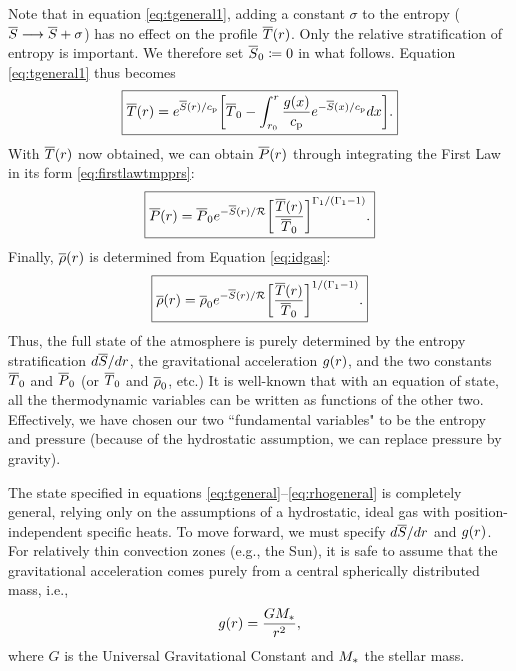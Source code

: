\documentclass[12pt]{article} %
\begin{document}
	Note that in equation \eqref{eq:tgeneral1}, adding a constant $\sigma$ to the entropy ($\overline{S}\longrightarrow \overline{S}+\sigma$) has no effect on the profile $\overline{T}(r)$. Only the relative stratification of entropy is important. We therefore set $\overline{S}_0\coloneqq0$ in what follows. Equation \eqref{eq:tgeneral1} thus becomes
		\begin{align}
		\boxed{
			\overline{T}(r) = e^{\overline{S}(r)/c_{\rm{p}}}\bigg{[}\overline{T}_0-\int_{r_0}^r \frac{g(x)}{c_{\rm{p}}}e^{-\overline{S}(x)/c_{\rm{p}}}dx \bigg{]}.
			\label{eq:tgeneral}}
	\end{align}
	With $\overline{T}(r)$ now obtained, we can obtain $\overline{P}(r)$ through integrating the First Law in its form \eqref{eq:firstlawtmpprs}:
	\begin{align}
	\boxed{
	\overline{P}(r)=\overline{P}_0e^{-\overline{S}(r)/\mathcal{R}} \bigg{[}\frac{\overline{T}(r)}{\overline{T}_0}\bigg{]}^{\Gamma_1/(\Gamma_1 - 1)}.
}
\label{eq:pgeneral}
	\end{align}
	Finally, $\overline{\rho}(r)$ is determined from Equation \eqref{eq:idgas}:
	\begin{align}
	\boxed{
	\overline{\rho}(r)=\overline{\rho}_0e^{-\overline{S}(r)/\mathcal{R}} \bigg{[}\frac{\overline{T}(r)}{\overline{T}_0}\bigg{]}^{1/(\Gamma_1 - 1)}.
}
\label{eq:rhogeneral}
	\end{align}
	Thus, the full state of the atmosphere is purely determined by the entropy stratification $d\overline{S}/dr$, the gravitational acceleration $g(r)$, and the two constants $\overline{T}_0$ and $\overline{P}_0$ (or $\overline{T}_0$ and $\overline{\rho}_0$, etc.) It is well-known that with an equation of state, all the thermodynamic variables can be written as functions of the other two. Effectively, we have chosen our two ``fundamental variables" to be the entropy and pressure (because of the hydrostatic assumption, we can replace pressure by gravity). 
	
	The state specified in equations \eqref{eq:tgeneral}--\eqref{eq:rhogeneral} is completely general, relying only on the assumptions of a hydrostatic, ideal gas with position-independent specific heats. To move forward, we must specify $d\overline{S}/dr$ and $g(r)$. For relatively thin convection zones (e.g., the Sun), it is safe to assume that the gravitational acceleration comes purely from a central spherically distributed mass, i.e., 
	\begin{align}
	g(r)=\frac{GM_*}{r^2},
	\label{eq:gpointmass}
	\end{align}
	where $G$ is the Universal Gravitational Constant and $M_*$ the stellar mass. 
\end{document}
